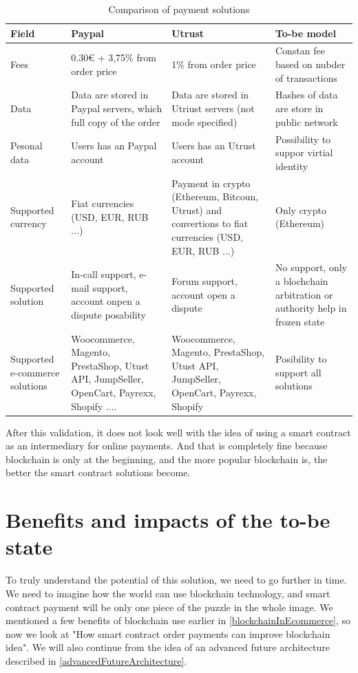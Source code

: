 \documentclass[thesis=M,english]{FITthesis}[2019/12/23]
\begin{document}
\begin{table}[ht!]
\caption{Comparison of payment solutions} \label{comparisionOfSolutions}
\begin{tabular}{| p{2cm} | p{3cm} | p{3cm} | p{3cm} | }
\hline
Field &
  Paypal &
  Utrust &
  To-be model \\ \hline
Fees &
  0.30€ + 3,75\% from order price &
  1\% from order price &
  Constan fee based on nubder of transactions \\ \hline
Data &
  Data are stored in Paypal servers, which full copy of the order &
  Data are stored in Utriust servers (not mode specified) &
  Hashes of data are store in public network \\ \hline
Pesonal data &
  Users has an Paypal account &
  Users has an Utrust account &
  Possibility to suppor virtial identity \\ \hline
Supported currency &
  Fiat currencies (USD, EUR, RUB ...) &
  Payment in crypto (Ethereum, Bitcoun, Utrust) and convertions to fiat currencies (USD, EUR, RUB ...) &
  Only crypto (Ethereum) \\ \hline
Supported solution &
  In-call support, e-mail support, account onpen a dispute posability &
  Forum support, account open a dispute &
  No support, only a blochchain arbitration or authority help in frozen state \\ \hline
Supported e-commerce solutions &
  Woocommerce, Magento, PrestaShop, Utust API, JumpSeller, OpenCart, Payrexx, Shopify .... &
  Woocommerce, Magento, PrestaShop, Utust API, JumpSeller, OpenCart, Payrexx, Shopify &
  Posibility to support all solutions \\ \hline
\end{tabular}
\end{table}

After this validation, it does not look well with the idea of using a smart contract as an intermediary for online payments. And that is completely fine because blockchain is only at the beginning, and the more popular blockchain is, the better the smart contract solutions become. 

\section{Benefits and impacts of the to-be state}

To truly understand the potential of this solution, we need to go further in time. We need to imagine how the world can use blockchain technology, and smart contract payment will be only one piece of the puzzle in the whole image. We mentioned a few benefits of blockchain use earlier in \ref{blockchainInEcommerce}, so now we look at "How smart contract order payments can improve blockchain idea". We will also continue from the idea of an advanced future architecture described in \ref{advancedFutureArchitecture}.
\end{document}
